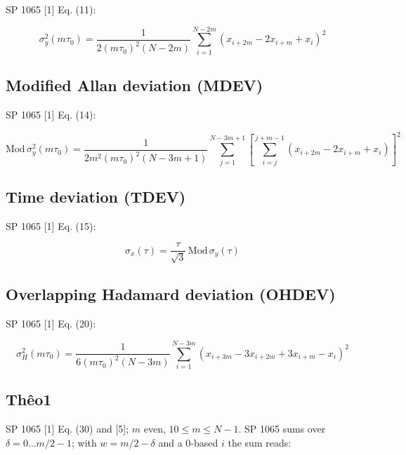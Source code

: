 \documentclass[10pt,a4paper]{article}
\begin{document}
SP 1065 {[}1{]} Eq. (11):

\[
\sigma_y^2(m\tau_0) = \frac{1}{2(m\tau_0)^2 (N-2m)} \sum_{i=1}^{N-2m}
\left(x_{i+2m} - 2x_{i+m} + x_i\right)^2
\]


\hypertarget{modified-allan-deviation-mdev}{%
\subsection{Modified Allan deviation (MDEV)}\label{modified-allan-deviation-mdev}}

SP 1065 {[}1{]} Eq. (14):

\[
\mathrm{Mod}\,\sigma_y^2(m\tau_0) = \frac{1}{2 m^2 (m\tau_0)^2 (N-3m+1)}
\sum_{j=1}^{N-3m+1}\left[\sum_{i=j}^{j+m-1}
\left(x_{i+2m}-2x_{i+m}+x_i\right)\right]^2
\]


\hypertarget{time-deviation-tdev}{%
\subsection{Time deviation (TDEV)}\label{time-deviation-tdev}}

SP 1065 {[}1{]} Eq. (15):

\[
\sigma_x(\tau) = \frac{\tau}{\sqrt{3}}\,\mathrm{Mod}\,\sigma_y(\tau)
\]


\hypertarget{overlapping-hadamard-deviation-ohdev}{%
\subsection{Overlapping Hadamard deviation (OHDEV)}\label{overlapping-hadamard-deviation-ohdev}}

SP 1065 {[}1{]} Eq. (20):

\[
\sigma_H^2(m\tau_0) = \frac{1}{6(m\tau_0)^2 (N-3m)}
\sum_{i=1}^{N-3m}\left(x_{i+3m}-3x_{i+2m}+3x_{i+m}-x_i\right)^2
\]


\hypertarget{thuxeao1}{%
\subsection{Thêo1}\label{thuxeao1}}

SP 1065 {[}1{]} Eq. (30) and {[}5{]}; \(m\) even, \(10 \le m \le N-1\). SP 1065 sums
over \(\delta = 0 \dots m/2-1\); with \(w = m/2 - \delta\) and a 0-based \(i\) the
sum reads:
\end{document}
